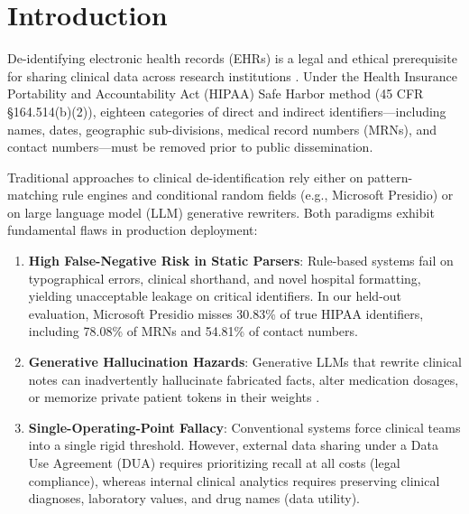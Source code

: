 \documentclass[11pt,a4paper]{article}
\begin{document}
\section{Introduction}
De-identifying electronic health records (EHRs) is a legal and ethical prerequisite for sharing clinical data across research institutions \cite{meystre2010clinical, neamatullah2008automated}. Under the Health Insurance Portability and Accountability Act (HIPAA) Safe Harbor method (45 CFR \S 164.514(b)(2)), eighteen categories of direct and indirect identifiers---including names, dates, geographic sub-divisions, medical record numbers (MRNs), and contact numbers---must be removed prior to public dissemination.

Traditional approaches to clinical de-identification rely either on pattern-matching rule engines and conditional random fields \cite{stubbs2015annotating, derczynski2017analysis} (e.g., Microsoft Presidio) or on large language model (LLM) generative rewriters. Both paradigms exhibit fundamental flaws in production deployment:
\begin{enumerate}
    \item \textbf{High False-Negative Risk in Static Parsers}: Rule-based systems fail on typographical errors, clinical shorthand, and novel hospital formatting, yielding unacceptable leakage on critical identifiers. In our held-out evaluation, Microsoft Presidio misses 30.83\% of true HIPAA identifiers, including 78.08\% of MRNs and 54.81\% of contact numbers.
    \item \textbf{Generative Hallucination Hazards}: Generative LLMs that rewrite clinical notes can inadvertently hallucinate fabricated facts, alter medication dosages, or memorize private patient tokens in their weights \cite{carlini2021extracting}.
    \item \textbf{Single-Operating-Point Fallacy}: Conventional systems force clinical teams into a single rigid threshold. However, external data sharing under a Data Use Agreement (DUA) requires prioritizing recall at all costs (legal compliance), whereas internal clinical analytics requires preserving clinical diagnoses, laboratory values, and drug names (data utility).
\end{enumerate}
\end{document}
